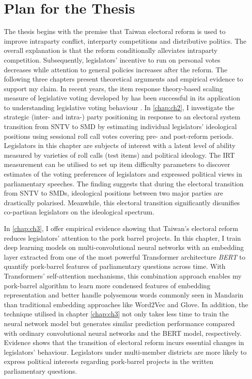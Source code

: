 \section*{\centering Plan for the Thesis}
The thesis begins with the premise that Taiwan electoral reform is used to improve intraparty conflict, interparty competitions and distributive politics. The overall explanation is that the reform conditionally alleviates intraparty competition. Subsequently, legislators' incentive to run on personal votes decreases while attention to general policies increases after the reform. The following three chapters present theoretical arguments and empirical evidence to support my claim. In recent years, the item response theory-based scaling measure of legislative voting developed by \citet{Clinton2004} has been successful in its application to understanding legislative voting behaviour \citep[e.g.][]{Zucco2011, Tsai2020, Gray2019}. In \autoref{chap:ch2}, I 
investigate the strategic (inter- and intra-) party positioning in response to an electoral system transition from SNTV to SMD by estimating individual legislators' ideological positions using sessional roll call votes covering pre- and post-reform periods. Legislators in this chapter are subjects of interest with a latent level of ability measured by varieties of roll calls  (test items) and political ideology. The IRT measurement can be utilised to set up item difficulty parameters to discover estimates of the voting preferences of legislators and expressed political views in parliamentary speeches. The finding suggests that during the electoral transition from SNTV to SMDs, ideological positions between two major parties are drastically polarised. Meanwhile, this electoral transition significantly disunifies co-partisan legislators on the ideological spectrum. 

In \autoref{chap:ch3}, I offer empirical evidence showing that Taiwan's electoral reform reduces legislators' attention to the pork barrel projects. In this chapter, I train deep learning models on multi-convolutional neural networks with an embedding layer extracted from one of the most powerful Transformer architecture \textit{BERT} to quantify pork-barrel features of parliamentary questions across time. With Transformers' self-attention mechanisms, this combination approach enables my pork-barrel algorithm to learn more condensed features of embedding representation and better handle polysemous words commonly seen in Mandarin than traditional embedding approaches like Word2Vec and Glove. In addition, the technique utilised in chapter \autoref{chap:ch3} not only takes less time to train the neural network model but generates similar prediction performance compared with ordinary convolutional neural networks and the BERT model, respectively. Evidence shows that the transition of electoral reform incurs essential changes in legislators' behaviour. Legislators under multi-member districts are more likely to express political interests regarding pork-barrel projects in the written parliamentary questions. 

